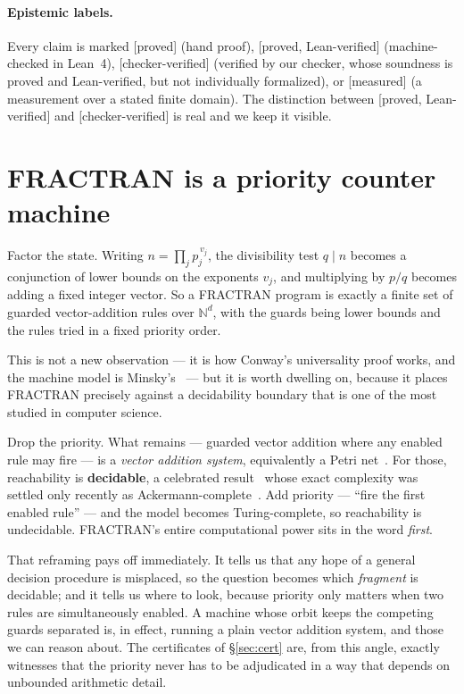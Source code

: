 \documentclass[11pt,a4paper]{article}
\theoremstyle{plain}
\theoremstyle{definition}
\newcommand{\Proved}{\textcolor{linkc}{\textsf{[proved]}}}
\newcommand{\Lean}{\textcolor{linkc}{\textsf{[proved, Lean-verified]}}}
\newcommand{\Chk}{\textcolor{linkc}{\textsf{[checker-verified]}}}
\newcommand{\Meas}{\textcolor{linkc}{\textsf{[measured]}}}
\begin{document}
\paragraph{Epistemic labels.} Every claim is marked \Proved{} (hand
proof), \Lean{} (machine-checked in Lean~4), \Chk{} (verified by our
checker, whose soundness is proved and Lean-verified, but not
individually formalized), or \Meas{} (a measurement over a stated finite
domain). The distinction between \Lean{} and \Chk{} is real and we keep
it visible.

\section{FRACTRAN is a priority counter machine}\label{sec:vas}

Factor the state. Writing $n = \prod_j p_j^{\,v_j}$, the divisibility
test $q \mid n$ becomes a conjunction of lower bounds on the exponents
$v_j$, and multiplying by $p/q$ becomes adding a fixed integer vector.
So a FRACTRAN program is exactly a finite set of guarded vector-addition
rules over $\mathbb{N}^d$, with the guards being lower bounds and the
rules tried in a fixed priority order.

This is not a new observation --- it is how Conway's universality proof
works, and the machine model is Minsky's~\cite{minsky1967} --- but it is
worth dwelling on, because it places FRACTRAN precisely against a
decidability boundary that is one of the most studied in computer
science.

Drop the priority. What remains --- guarded vector addition where any
enabled rule may fire --- is a \emph{vector addition system}, equivalently
a Petri net~\cite{karpmiller}. For those, reachability is
\textbf{decidable}, a celebrated result~\cite{mayr,kosaraju} whose exact
complexity was settled only recently as Ackermann-complete~\cite{ack}.
Add priority --- ``fire the first enabled rule'' --- and the model
becomes Turing-complete, so reachability is undecidable. FRACTRAN's
entire computational power sits in the word \emph{first}.

That reframing pays off immediately. It tells us that any hope of a
general decision procedure is misplaced, so the question becomes which
\emph{fragment} is decidable; and it tells us where to look, because
priority only matters when two rules are simultaneously enabled. A
machine whose orbit keeps the competing guards separated is, in effect,
running a plain vector addition system, and those we can reason about.
The certificates of \S\ref{sec:cert} are, from this angle, exactly
witnesses that the priority never has to be adjudicated in a way that
depends on unbounded arithmetic detail.
\end{document}
